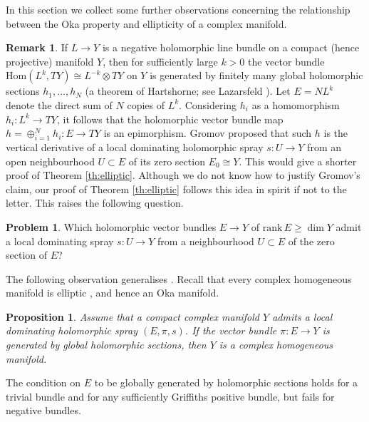 \documentclass[12pt]{amsart}
\newtheorem{proposition}[theorem]{Proposition}
\theoremstyle{definition}
\newtheorem{remark}[theorem]{Remark}
\newtheorem{problem}[theorem]{Problem}
\numberwithin{equation}{section}
\numberwithin{figure}{section}
\newcommand\Hom{\mathrm{Hom}}
\numberwithin{equation}{section}
\begin{document}
In this section we collect some further observations
concerning the relationship between the Oka property and 
ellipticity of a complex manifold.

\begin{remark}\label{rem:elliptic}
If $L\to Y$ is a negative holomorphic line bundle on a compact 
(hence projective) manifold $Y$, 
then for sufficiently large $k>0$ the vector bundle 
$\Hom(L^k,TY)\cong L^{-k}\otimes TY$ on $Y$ is generated by finitely 
many global holomorphic sections $h_1,\ldots, h_N$
(a theorem of Hartshorne; 
see Lazarsfeld \cite[Theorem 6.1.10]{Lazarsfeld-2-2004}). 
Let $E=N L^k$ denote the direct sum of $N$ copies of $L^k$.
Considering $h_i$ as a homomorphism 
$h_i:L^k\to TY$, it follows that the holomorphic vector bundle map
$h = \oplus_{i=1}^N h_i : E\to TY$ is an epimorphism.
Gromov proposed \cite[3.2.A', Step 2, p.\ 879]{Gromov1989}
that such $h$ is the vertical derivative of a local dominating holomorphic 
spray $s:U\to Y$ from an open neighbourhood $U\subset E$
of its zero section $E_0\cong Y$. This would give a shorter
proof of Theorem \ref{th:elliptic}.
Although we do not know how to justify Gromov's claim,
our proof of Theorem \ref{th:elliptic} follows this idea in spirit 
if not to the letter. This raises the following question.
\end{remark}

\begin{problem} \label{prob:localspray}
Which holomorphic vector bundles $E\to Y$ of 
$\mathrm{rank}\,E\ge \dim Y$ 
admit a local dominating spray $s:U\to Y$ from a neighbourhood
$U\subset E$ of the zero section of $E$?
\end{problem}

The following observation generalises 
\cite[Proposition 6.2]{Forstneric2019MMJ}. 
Recall that every complex homogeneous manifold is 
elliptic \cite[Proposition 5.6.1]{Forstneric2017E}, and hence 
an Oka manifold.

\begin{proposition}\label{prop:homogeneous}
Assume that a compact complex manifold $Y$ admits a 
local dominating holomorphic spray $(E,\pi,s)$. If the 
vector bundle $\pi:E\to Y$
is generated by global holomorphic sections, 
then $Y$ is a complex homogeneous manifold. 
\end{proposition}

The condition on $E$ to be globally generated by holomorphic 
sections holds for a trivial bundle 
and for any sufficiently Griffiths positive bundle, 
but fails for negative bundles.
\end{document}
